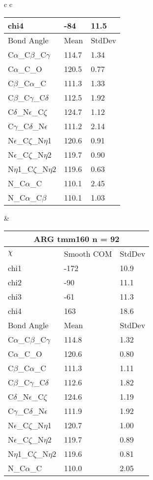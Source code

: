 \begin{longtable}{ c c }
\begin{tabular}{ l l l }
  chi4 & -84 & 11.5 \\ \midrule
  Bond Angle   & Mean     & StdDev \\ \midrule
  C$\alpha$\_C$\beta$\_C$\gamma$ & 114.7 & 1.34\\
  C$\alpha$\_C\_O & 120.5 & 0.77\\
  C$\beta$\_C$\alpha$\_C & 111.3 & 1.33\\
  C$\beta$\_C$\gamma$\_C$\delta$ & 112.5 & 1.92\\
  C$\delta$\_N$\epsilon$\_C$\zeta$ & 124.7 & 1.12\\
  C$\gamma$\_C$\delta$\_N$\epsilon$ & 111.2 & 2.14\\
  N$\epsilon$\_C$\zeta$\_N$\eta$1 & 120.6 & 0.91\\
  N$\epsilon$\_C$\zeta$\_N$\eta$2 & 119.7 & 0.90\\
  N$\eta$1\_C$\zeta$\_N$\eta$2 & 119.6 & 0.63\\
  N\_C$\alpha$\_C & 110.1 & 2.45\\
  N\_C$\alpha$\_C$\beta$ & 110.1 & 1.03\\
  \bottomrule
  \end{tabular}
  &
  \begin{tabular}{ l l l }
  \toprule
  \multicolumn{3}{c}{ARG \textbf{tmm160} n = 92} \\ \toprule
  $\chi$       & Smooth COM & StdDev \\ \midrule
  chi1 & -172 & 10.9 \\ 
  chi2 & -90 & 11.1 \\ 
  chi3 & -61 & 11.3 \\ 
  chi4 & 163 & 18.6 \\ \midrule
  Bond Angle   & Mean     & StdDev \\ \midrule
  C$\alpha$\_C$\beta$\_C$\gamma$ & 114.8 & 1.32\\
  C$\alpha$\_C\_O & 120.6 & 0.80\\
  C$\beta$\_C$\alpha$\_C & 111.3 & 1.11\\
  C$\beta$\_C$\gamma$\_C$\delta$ & 112.6 & 1.82\\
  C$\delta$\_N$\epsilon$\_C$\zeta$ & 124.6 & 1.19\\
  C$\gamma$\_C$\delta$\_N$\epsilon$ & 111.9 & 1.92\\
  N$\epsilon$\_C$\zeta$\_N$\eta$1 & 120.7 & 1.00\\
  N$\epsilon$\_C$\zeta$\_N$\eta$2 & 119.7 & 0.89\\
  N$\eta$1\_C$\zeta$\_N$\eta$2 & 119.6 & 0.81\\
  N\_C$\alpha$\_C & 110.0 & 2.05\\

\end{tabular}
\end{longtable}
